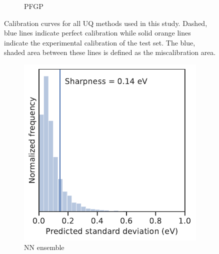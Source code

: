 \documentclass[]{achemso}
\begin{document}
\begin{figure}
\begin{subfigure}{0.32\textwidth}
        \caption{\gls{PFGP}}\label{fig:calibration_pfgp}
    \end{subfigure}
    \caption{Calibration curves for all \gls{UQ} methods used in this study.
    Dashed, blue lines indicate perfect calibration while solid orange lines indicate the experimental calibration of the test set.
    The blue, shaded area between these lines is defined as the miscalibration area.
    }\label{fig:calibration}
\end{figure}

\begin{figure}
    \centering
    \begin{subfigure}{0.32\textwidth}
        \includegraphics[width=\textwidth]{../NN_ensemble/sharpness.pdf}
        \caption{\gls{NN} ensemble}\label{fig:sharpness_ensemble}
    \end{subfigure}
    \begin{subfigure}{0.32\textwidth}

\end{subfigure}
\end{figure}
\end{document}
